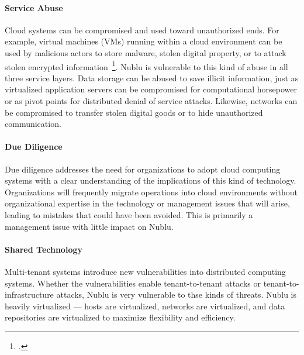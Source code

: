 \documentclass[10pt,letterpaper]{article}
\begin{document}
\paragraph{Service Abuse} Cloud systems can be compromised and used toward unauthorized ends.  For example, virtual machines (VMs) running within a cloud environment can be used by malicious actors to store malware, stolen digital property, or to attack stolen encrypted information~\footcite{ZhJuReRi:12}.  Nublu is vulnerable to this kind of abuse in all three service layers.  Data storage can be abused to save illicit information, just as virtualized application servers can be compromised for computational horsepower or as pivot points for distributed denial of service attacks.  Likewise, networks can be compromised to transfer stolen digital goods or to hide unauthorized communication.

\paragraph{Due Diligence} Due diligence addresses the need for organizations to adopt cloud computing systems with a clear understanding of the implications of this kind of technology.  Organizations will frequently migrate operations into cloud environments without organizational expertise in the technology or management issues that will arise, leading to mistakes that could have been avoided.  This is primarily a management issue with little impact on Nublu.

\paragraph{Shared Technology} Multi-tenant systems introduce new vulnerabilities into distributed computing systems.  Whether the vulnerabilities enable tenant-to-tenant attacks or tenant-to-infrastructure attacks, Nublu is very vulnerable to thse kinds of threats.  Nublu is heavily virtualized --- hosts are virtualized, networks are virtualized, and data repositories are virtualized to maximize flexibility and efficiency.

\end{document}
